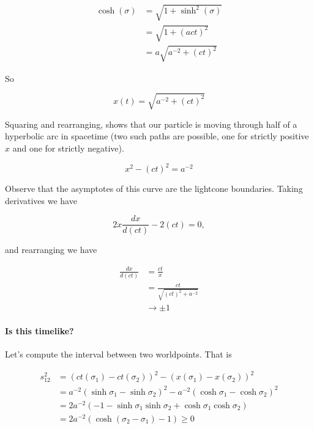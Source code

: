 \begin{align*}
\cosh(\sigma)
&= \sqrt{1 + \sinh^2(\sigma)}  \\
&= \sqrt{ 1 + (act)^2 }  \\
&= a \sqrt{ a^{-2} + (ct)^2 }
\end{align*}

So

\begin{equation}\label{eqn:relativisticElectrodynamicsT2:20}
x(t) = \sqrt{ a^{-2} + (ct)^2 }
\end{equation}

Squaring and rearranging, shows that our particle is moving through half of a hyperbolic arc in spacetime (two such paths are possible, one for strictly positive $x$ and one for strictly negative).

\begin{equation}\label{eqn:relativisticElectrodynamicsT2:30}
x^2 - (ct)^2 = a^{-2}
\end{equation}

Observe that the asymptotes of this curve are the lightcone boundaries.  Taking derivatives we have

\begin{equation}\label{eqn:relativisticElectrodynamicsT2:40}
2 x \frac{dx}{d(ct)} -2 (ct) = 0,
\end{equation}

and rearranging we have

\begin{align*}
\frac{dx}{d(ct)}
&= \frac{c t}{x} \\
&= \frac{ct}{\sqrt{(ct)^2 + a^{-2}}} \\
&\rightarrow \pm 1
\end{align*}

\paragraph{Is this timelike?}

Let's compute the interval between two worldpoints.  That is

\begin{align*}
s_{12}^2
&= (ct(\sigma_1) - ct(\sigma_2))^2 - (x(\sigma_1) - x(\sigma_2))^2  \\
&= a^{-2} (\sinh \sigma_1 - \sinh \sigma_2)^2 - a^{-2} (\cosh\sigma_1 - \cosh\sigma_2)^2 \\
&= 2 a^{-2} \left( -1 - \sinh\sigma_1 \sinh \sigma_2 + \cosh\sigma_1 \cosh\sigma_2 \right) \\
&= 2 a^{-2} \left( \cosh( \sigma_2 - \sigma_1) -1 \right) \ge 0
\end{align*}

